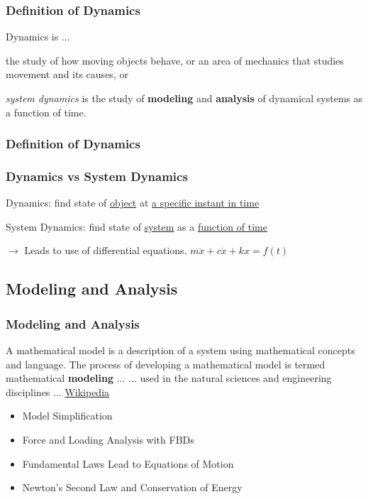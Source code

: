 \documentclass[fleqn]{beamer} %
\newcommand{\sectionIsubsectionItitle}{Definition of Dynamics}
\newcommand{\sectionIsubsectionIItitle}{Modeling and Analysis}
\begin{document}
			\begin{frame}
				\frametitle{\sectionIsubsectionItitle}
				\bigskip

				\large
				Dynamics is ...\vspcc

				the study of how moving objects behave, \vspcc
				or \vspcc
				an area of mechanics that studies movement and its causes,\vspcc
				or \vspcc

				{\it system dynamics} is the study of {\bf modeling} and {\bf analysis} of dynamical systems as a function of time.\vspc

				\btVFill
			\end{frame}

			\begin{frame}
				\frametitle{\sectionIsubsectionItitle}
				\bigskip

				\frametitle{Dynamics vs System Dynamics}

				\large
				Dynamics: find state of \underline{object} at \underline{a specific instant in time} \vspccc

				System Dynamics: find state of \underline{system} as a \underline{function of time}  \vspc

				$\rightarrow$ Leads to use of differential equations. $m\ddot{x}+c\dot{x}+kx=f(t)$

				\btVFill
			\end{frame}

		\subsection{\sectionIsubsectionIItitle}\label{sectionIsubsectionII}

			\begin{frame}
				\frametitle{\sectionIsubsectionIItitle}
				\bigskip

				A mathematical model is a description of a system using mathematical concepts and language. The process of developing a mathematical model is termed mathematical {\bf modeling} ... \vspc
				...  used in the natural sciences and engineering disciplines ...  \href{https://en.wikipedia.org/wiki/Mathematical_model}{\tiny Wikipedia}

				\begin{itemize}
					\item Model Simplification
					\item Force and Loading Analysis with FBDs
					\item Fundamental Laws Lead to Equations of Motion
					\item Newton's Second Law and Conservation of Energy
				\end{itemize}

				\btVFill
			\end{frame}
\end{document}
